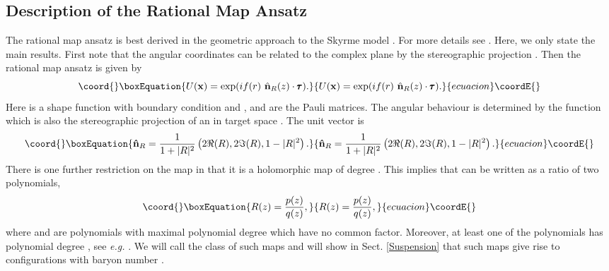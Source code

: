 \documentclass[a4paper,12pt]{article}
\def\vectau{{\pmb{\tau}}}
\begin{document}
\subsection{Description of the Rational Map Ansatz}
\label{Ransatz}


The rational map ansatz is best derived in the geometric approach 
to the Skyrme model \cite{Manton:1987xt}. For more details see
\cite{Houghton:1998kg, Krusch:2000gb}. Here, we only state the main 
results.
%
First note that the angular coordinates \myHighlight{$(\theta, \phi)$}\coordHE{} can be
related  to the complex plane \coordHE{} by the stereographic projection 
\coordHE{}. Then the rational map 
ansatz is given by
%
\begin{equation}\coord{}\boxEquation{
\label{Urational}
U({\bf x}) = \exp (i f(r)\ {\hat {\bf n}}_R(z) \cdot \vectau).
}{
U({\bf x}) = \exp (i f(r)\ {\hat {\bf n}}_R(z) \cdot \vectau).
}{ecuacion}\coordE{}\end{equation}
%
Here \coordHE{} is a shape function with boundary condition \coordHE{}
and  \coordHE{}, and \coordHE{} are the Pauli matrices. The
angular  behaviour is determined by the function  \coordHE{} which is 
also the stereographic projection of an \coordHE{} in target space 
\coordHE{}. The unit vector \coordHE{} is  
\begin{equation}\coord{}\boxEquation{
\label{normalR}
{\bf {\hat n}}_R = \frac{1}{1 + |R|^2} \left( 2 \Re(R), 2 \Im(R), 1 -
|R|^2 \right).
}{
{\bf {\hat n}}_R = \frac{1}{1 + |R|^2} \left( 2 \Re(R), 2 \Im(R), 1 -
|R|^2 \right).
}{ecuacion}\coordE{}\end{equation}
%
There is one further restriction on the map \coordHE{} in that it is a
holomorphic map of degree \coordHE{}. This implies that \coordHE{} can be written
as  a ratio of two polynomials,
%
\begin{equation}\coord{}\boxEquation{
R(z) = \frac{p(z)}{q(z)},
}{
R(z) = \frac{p(z)}{q(z)},
}{ecuacion}\coordE{}\end{equation} 
%
where \coordHE{} and \coordHE{} are polynomials with maximal polynomial degree
\coordHE{} which have no common factor.  Moreover, at least one of the 
polynomials has polynomial degree \coordHE{}, see {\it e.g.} 
\cite{Jarvis:1996}. We will call the class of such maps 
\coordHE{} and will show in Sect. \ref{Suspension} 
that such maps give rise to configurations with baryon
number \coordHE{}.
\end{document}

